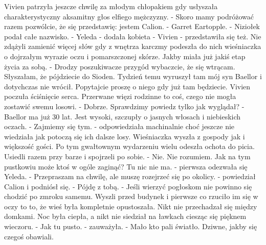 \documentclass[10pt,twoside,twocolumn]{book}
\begin{document}
Vivien patrzyła jeszcze chwilę za młodym chłopakiem gdy usłyszała charakterystyczny aksamitny głos elfiego mężczyzny.
\indent - Skoro mamy podróżować razem pozwólcie, że się przedstawię: jestem Calion.\newline
\indent - Garret Eartopple. - Niziołek podał całe nazwisko.\newline
\indent - Yeleda - dodała kobieta\newline
\indent - Vivien - przedstawiła się też.\newline
Nie zdążyli zamienić więcej słów gdy z wnętrza karczmy podeszła do nich wieśniaczka o dojrzałym wyrazie oczu i pomarszczonej skórze. Jakby miała już jakiś etap życia za sobą.\newline
\indent - Drodzy poszukiwacze przygód wybaczcie, że się wtrącam. Słyszałam, że pójdziecie do Sioden. Tydzień temu wyruszył tam mój syn Baellor i dotychczas nie wrócił. Popytajcie proszę o niego gdy już tam będziecie.\newline
Vivien poczuła ściśnięcie serca. Przerwane więzi rodzinne to coś, czego nie mogła zostawić swemu losowi.\newline
\indent - Dobrze. Sprawdzimy powiedz tylko jak wyglądał?\newline
\indent - Baellor ma już 30 lat. Jest wysoki, szczupły o jasnych włosach i niebieskich oczach.\newline
\indent - Zajmiemy się tym. - odpowiedziała machinalnie choć jeszcze nie wiedziała jak potoczą się ich dalsze losy.\newline
Wieśniaczka wyszła z gospody jak i większość gości. Po tym gwałtownym wydarzeniu wielu odeszła ochota do picia. Usiedli razem przy barze i spojrzeli po sobie.\newline
\indent - Nie. Nie rozumiem. Jak na tym pustkowiu może ktoś w ogóle zaginąć? Tu nic nie ma. - pierwsza odezwała się Yeleda.\newline
\indent - Przepraszam na chwilę, ale muszę rozejrzeć się po okolicy. - powiedział Calion i podniósł się.\newline
\indent - Pójdę z tobą. - Jeśli wierzyć pogłoskom nie powinno się chodzić po zmroku samemu.\newline
Wyszli przed budynek i pierwsze co rzuciło im się w oczy to to, że wieś była kompletnie opustoszała. Nikt nie przechadzał się między domkami. Noc była ciepła, a nikt nie siedział na ławkach ciesząc się pięknem wieczoru.
\indent - Jak tu pusto. - zauważyła.\newline
\indent - Mało kto pali światło. Dziwne, jakby się czegoś obawiali.\newline
\end{document}
